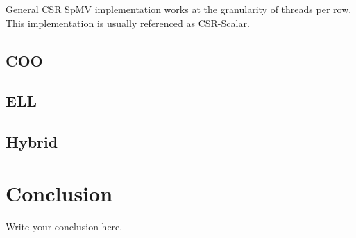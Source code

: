 \documentclass{article}
\begin{document}
General CSR SpMV implementation works at the granularity of threads per row. This implementation is usually referenced as CSR-Scalar.

\subsection{COO}

\subsection{ELL}

\subsection{Hybrid}


\section{Conclusion}
Write your conclusion here.
\end{document}

